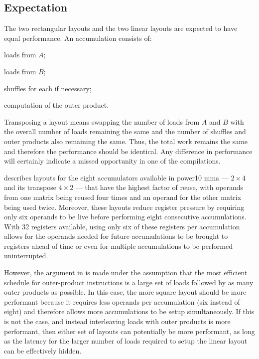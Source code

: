 \documentclass[\main/thesis.tex]{subfiles}
\begin{document}
\subsection{Expectation}
\label{sec:layoutExpectation}
The two rectangular layouts and the two linear layouts are expected to have equal performance.
An accumulation consists of: 
\begin{enumerate*}
\item loads from $A$;
\item loads from $B$;
\item shuffles for each if necessary; 
\item computation of the outer product.
\end{enumerate*}
Transposing a layout means swapping the number of loads from $A$ and $B$ with the overall number of loads remaining the same and the number of shuffles and outer products also remaining the same.
Thus, the total work remains the same and therefore the performance should be identical.
Any difference in performance will certainly indicate a missed opportunity in one of the compilations.

 describes layouts for the eight accumulators available in \gls{power10} \gls{mma} --- $2 \times 4$ and its transpose $4 \times 2$ --- that have the highest factor of reuse, with operands from one matrix being reused four times and an operand for the other matrix being used twice.
Moreover, these layouts reduce register pressure by requiring only six operands to be \gls{live} before performing eight consecutive accumulations.
With 32 registers available, using only six of these registers per accumulation allows for the operands needed for future 
 accumulations to be brought to registers ahead of time or even for multiple accumulations to be performed uninterrupted.

However, the argument in  is made under the assumption that the most efficient schedule for outer-product instructions is a large set of loads followed by as many outer products as possible.
In this case, the more square layout should be more performant because it requires less operands per accumulation (six instead of eight) and therefore allows more accumulations to be setup simultaneously.
If this is not the case, and instead interleaving loads with outer products is more performant, then either set of layouts can potentially be more performant, as long as the latency for the larger number of loads required to setup the linear layout can be effectively hidden.
\end{document}
